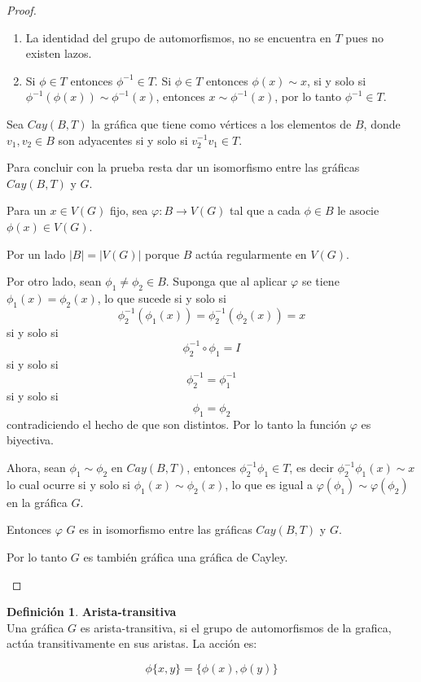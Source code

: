 \documentclass[12pt]{book}
\theoremstyle{definition}
\newtheorem{definition}{Definición}
\begin{document}
\begin{proof}
\begin{enumerate}
\begin{enumerate}
\item La identidad del grupo de automorfismos, no se encuentra en $T$
  pues no existen lazos.
\item Si $\phi \in T$ entonces $\phi^{-1}\in T$.
Si $\phi \in T$ entonces $\phi(x)\sim x$, si y solo si
$\phi^{-1}(\phi (x)) \sim \phi^{-1}(x)$, entonces $x \sim
\phi^{-1}(x)$, por lo tanto $\phi^{-1}\in T$.
\end{enumerate}

Sea $Cay(B,T)$ la gráfica que tiene como vértices a los elementos de
$B$, donde $v_1, v_2 \in B$ son adyacentes si y solo si $v_2^{-1}v_1
\in T$.

Para concluir con la prueba resta dar un isomorfismo entre las gráficas
$Cay(B,T)$ y $G$.

Para un $x\in V(G)$ fijo, sea $\varphi:B \rightarrow V(G)$ tal que a
cada $\phi \in B$ le asocie $\phi (x) \in V(G)$.

Por un lado $|B|=|V(G)|$ porque $B$ actúa regularmente en $V(G)$.

Por otro lado, sean $\phi_{1}\neq \phi_2 \in B$. Suponga que al
aplicar $\varphi$ se tiene $\phi_1(x)=\phi_2(x)$, lo que sucede si
y solo si
$$\phi_2^{-1}(\phi_1(x))=\phi_2^{-1}(\phi_2(x))=x$$
 si y solo si
 $$\phi_2^{-1}\circ \phi_1= I$$ si y solo si
$$\phi_2^{-1}=\phi_1^{-1}$$ si y solo si 
$$\phi_1 =\phi_2$$
contradiciendo el hecho de que son distintos. Por lo tanto la función $\varphi$
es biyectiva.

Ahora, sean $\phi_{1}\sim \phi_2$ en $Cay(B,T)$, entonces
$\phi_2^{-1}\phi_1 \in T$, es decir $\phi_2^{-1}\phi_1(x)\sim
x$ lo cual ocurre si y solo si $\phi_1(x)\sim \phi_2(x)$, lo que es
igual a $\varphi(\phi_1)\sim\varphi(\phi_2)$ en la gráfica
$G$.

Entonces $\varphi$ $G$ es in isomorfismo entre las gráficas
$Cay(B,T)$ y $G$. 

Por lo tanto $G$ es también gráfica una gráfica de Cayley.
\end{enumerate}
\end{proof}


\begin{definition}\textbf{Arista-transitiva}\\
  Una gráfica $G$ es arista-transitiva, si el grupo de automorfismos
  de la grafica, actúa
  transitivamente en sus aristas. La acción es:

  \begin{equation*}\phi\{x,y\}=\{\phi(x),\phi(y)\}\end{equation*}
\end{definition}
\end{document}
